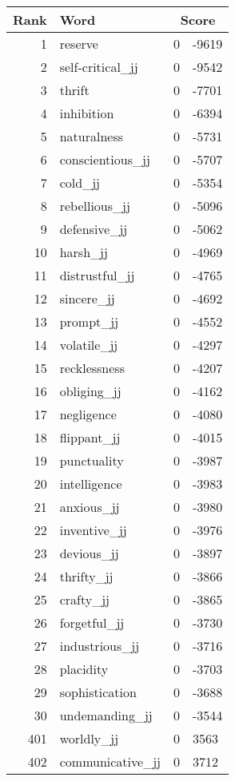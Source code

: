 \begin{longtable}[!htbp]{| rlr@{.}l |}
    \hline
    \textbf{Rank} & \textbf{Word} & \multicolumn{2}{c|}{\textbf{Score}} \\
    \hline
    \endhead
    1 & reserve & 0 & -9619 \\
    2 & self-critical\_jj & 0 & -9542 \\
    3 & thrift & 0 & -7701 \\
    4 & inhibition & 0 & -6394 \\
    5 & naturalness & 0 & -5731 \\
    6 & conscientious\_jj & 0 & -5707 \\
    7 & cold\_jj & 0 & -5354 \\
    8 & rebellious\_jj & 0 & -5096 \\
    9 & defensive\_jj & 0 & -5062 \\
    10 & harsh\_jj & 0 & -4969 \\
    11 & distrustful\_jj & 0 & -4765 \\
    12 & sincere\_jj & 0 & -4692 \\
    13 & prompt\_jj & 0 & -4552 \\
    14 & volatile\_jj & 0 & -4297 \\
    15 & recklessness & 0 & -4207 \\
    16 & obliging\_jj & 0 & -4162 \\
    17 & negligence & 0 & -4080 \\
    18 & flippant\_jj & 0 & -4015 \\
    19 & punctuality & 0 & -3987 \\
    20 & intelligence & 0 & -3983 \\
    21 & anxious\_jj & 0 & -3980 \\
    22 & inventive\_jj & 0 & -3976 \\
    23 & devious\_jj & 0 & -3897 \\
    24 & thrifty\_jj & 0 & -3866 \\
    25 & crafty\_jj & 0 & -3865 \\
    26 & forgetful\_jj & 0 & -3730 \\
    27 & industrious\_jj & 0 & -3716 \\
    28 & placidity & 0 & -3703 \\
    29 & sophistication & 0 & -3688 \\
    30 & undemanding\_jj & 0 & -3544 \\
    401 & worldly\_jj & 0 & 3563 \\
    402 & communicative\_jj & 0 & 3712 \\

\end{longtable}
